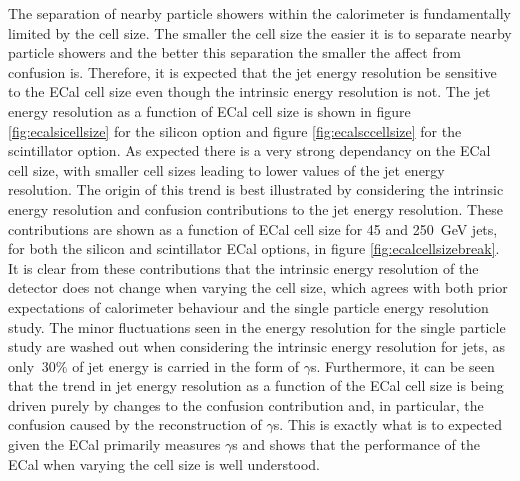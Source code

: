 The separation of nearby particle showers within the calorimeter is fundamentally limited by the cell size.  The smaller the cell size the easier it is to separate nearby particle showers and the better this separation the smaller the affect from confusion is.  Therefore, it is expected that the jet energy resolution be sensitive to the ECal cell size even though the intrinsic energy resolution is not.  The jet energy resolution as a function of ECal cell size is shown in figure \ref{fig:ecalsicellsize} for the silicon option and figure \ref{fig:ecalsccellsize} for the scintillator option.  As expected there is a very strong dependancy on the ECal cell size, with smaller cell sizes leading to lower values of the jet energy resolution.  The origin of this trend is best illustrated by considering the intrinsic energy resolution and confusion contributions to the jet energy resolution.  These contributions are shown as a function of ECal cell size for 45 and 250~GeV jets, for both the silicon and scintillator ECal options, in figure \ref{fig:ecalcellsizebreak}.  It is clear from these contributions that the intrinsic energy resolution of the detector does not change when varying the cell size, which agrees with both prior expectations of calorimeter behaviour and the single particle energy resolution study.  The minor fluctuations seen in the energy resolution for the single particle study are washed out when considering the intrinsic energy resolution for jets, as only $~30\%$ of jet energy is carried in the form of $\gamma$s.  Furthermore, it can be seen that the trend in jet energy resolution as a function of the ECal cell size is being driven purely by changes to the confusion contribution and, in particular, the confusion caused by the reconstruction of $\gamma$s.  This is exactly what is to expected given the ECal primarily measures $\gamma$s and shows that the performance of the ECal when varying the cell size is well understood.

